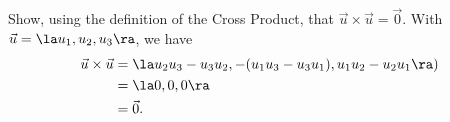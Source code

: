 {Show, using the definition of the Cross Product, that $\vec u\times\vec u=\vec 0$.}
{With $\vec u = \la u_1,u_2,u_3\ra$, we have
\begin{align*}
\vec u\times\vec u &= \la u_2u_3-u_3u_2,-(u_1u_3-u_3u_1),u_1u_2-u_2u_1\ra) \\
		&= \la 0,0,0\ra\\
		&=\vec 0.
\end{align*}
}